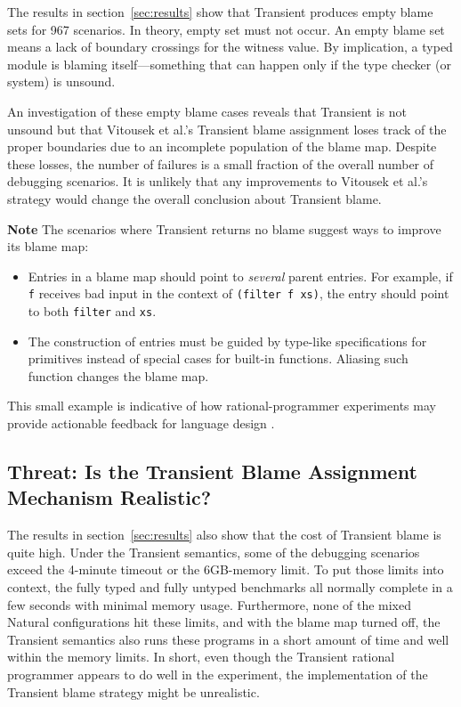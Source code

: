 The results in section~\ref{sec:results} show that Transient produces empty
blame sets for 967 scenarios. In theory, empty set must not occur. An
empty blame set means a lack of boundary crossings for the witness value.
By implication, a typed module is blaming itself---something that can
happen only if the type checker (or system) is unsound.

An investigation of these empty blame cases reveals that Transient is not
unsound but that Vitousek et al.'s Transient blame assignment loses track
of the proper boundaries due to an incomplete population of the blame map.
Despite these losses, the number of failures is a small fraction of the
overall number of debugging scenarios. It is unlikely that any
improvements to Vitousek et al.'s strategy would change the overall
conclusion about Transient blame.

{\bf Note} The scenarios where Transient returns no blame 
suggest ways to improve its blame map:
\begin{itemize}

\item Entries in a blame map should point to {\em several\/} parent entries.
 For example, if \texttt{f} receives bad input in the context of {\tt (filter f
 xs)}, the entry should point to both \texttt{filter} and \texttt{xs}.

\item The construction of entries must be guided by type-like specifications for
 primitives instead of special cases for built-in functions. Aliasing such
 function changes the blame map.

\end{itemize}
This small example is indicative of how rational-programmer experiments may
provide actionable feedback for language design . 


\subsection{Threat: Is the Transient Blame Assignment Mechanism Realistic?}
\label{sec:threat:transient2}

The results in section~\ref{sec:results} also show that the cost of Transient
blame is quite high. Under the Transient semantics, some of the debugging
scenarios exceed the 4-minute timeout or the 6GB-memory limit. To put those
limits into context, the fully typed and fully untyped benchmarks all normally complete
in a few seconds with minimal memory usage. Furthermore, none of the mixed
Natural configurations hit these limits, and with the blame map turned off,
the Transient semantics also runs these programs in a short amount of time and
well within the memory limits. In short, even though the Transient rational
programmer appears to do well in the experiment, the implementation of the
Transient blame strategy might be unrealistic. 

